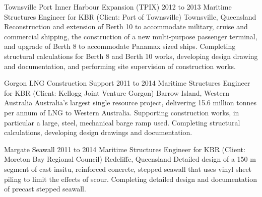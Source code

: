 	\entrytableproject%
	{Townsville Port Inner Harbour Expansion (TPIX)}
	{2012 to 2013}
	{}
	{Maritime Structures Engineer for KBR (Client: Port of Townsville)}
	{Townsville, Queensland}
	{Reconstruction and extension of Berth 10 to accommodate military, cruise and commercial shipping, the construction of a new multi-purpose passenger terminal, and upgrade of Berth 8 to accommodate Panamax sized ships.}
	{Completing structural calculations for Berth 8 and Berth 10 works, developing design drawing and documentation, and performing site supervision of construction works.}

	\entrytableproject%
	{Gorgon LNG Construction Support}
	{2011 to 2014}
	{}
	{Maritime Structures Engineer for KBR (Client: Kellogg Joint Venture Gorgon)}
	{Barrow Island, Western Australia}
	{Australia's largest single resource project, delivering 15.6 million tonnes per annum of LNG to Western Australia.}
	{Supporting construction works, in particular a large, steel, mechanical barge ramp used. Completing structural calculations, developing design drawings and documentation.}

	\entrytableproject%
	{Margate Seawall}
	{2011 to 2014}
	{}
	{Maritime Structures Engineer for KBR (Client: Moreton Bay Regional Council)}
	{Redcliffe, Queensland}
	{Detailed design of a 150 m segment of cast insitu, reinforced concrete, stepped seawall that uses vinyl sheet piling to limit the effects of scour.}
	{Completing detailed design and documentation of precast stepped seawall.}






